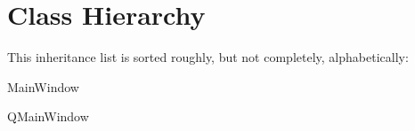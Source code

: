 \section{Class Hierarchy}
This inheritance list is sorted roughly, but not completely, alphabetically\+:\begin{DoxyCompactList}
\item {}
\begin{DoxyCompactList}
\item {}
\end{DoxyCompactList}
\item Main\+Window\begin{DoxyCompactList}
\item {}
\end{DoxyCompactList}
\item {}
\item {}
\item Q\+Main\+Window\begin{DoxyCompactList}
\item {}
\end{DoxyCompactList}
\item {}
\end{DoxyCompactList}
